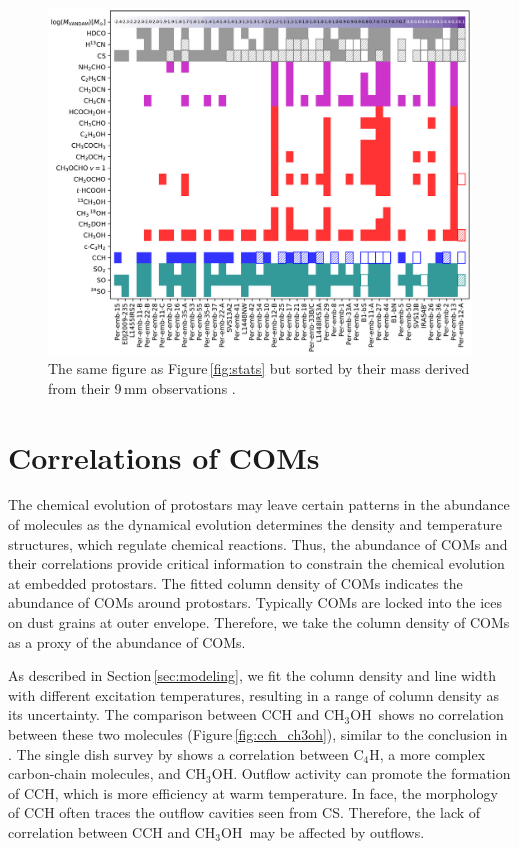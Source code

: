 \documentclass[twocolumn]{aastex62}
\newcommand{\methanol}{\mbox{CH$_{3}$OH}}
\begin{document}
\addtocounter{figure}{-1}
\begin{figure}[htbp!]
  \includegraphics[width=\textwidth]{stats_sorted_by_Mcont.pdf}
  \caption{The same figure as Figure\,\ref{fig:stats} but sorted by their mass derived from their 9\,mm observations \citep{2018ApJS..238...19T}.}
\end{figure}
\renewcommand{\thefigure}{\arabic{figure}}

\section{Correlations of COMs}
The chemical evolution of protostars may leave certain patterns in the abundance of molecules as the dynamical evolution determines the density and temperature structures, which regulate chemical reactions.  Thus, the abundance of COMs and their correlations provide critical information to constrain the chemical evolution at embedded protostars.  The fitted column density of COMs indicates the abundance of COMs around protostars.  Typically COMs are locked into the ices on dust grains at outer envelope. Therefore, we take the column density of COMs as a proxy of the abundance of COMs.  

As described in Section\,\ref{sec:modeling}, we fit the column density and line width with different excitation temperatures, resulting in a range of column density as its uncertainty.  The comparison between CCH and \methanol\ shows no correlation between these two molecules (Figure\,\ref{fig:cch_ch3oh}), similar to the conclusion in \citet{2018ApJS..236...52H}.  The single dish survey by \citet{2016ApJ...833..125G} shows a correlation between C$_{4}$H, a more complex carbon-chain molecules, and \methanol.  Outflow activity can promote the formation of CCH, which is more efficiency at warm temperature.  In face, the morphology of CCH often traces the outflow cavities seen from CS.  Therefore, the lack of correlation between CCH and \methanol\ may be affected by outflows.
\end{document}
